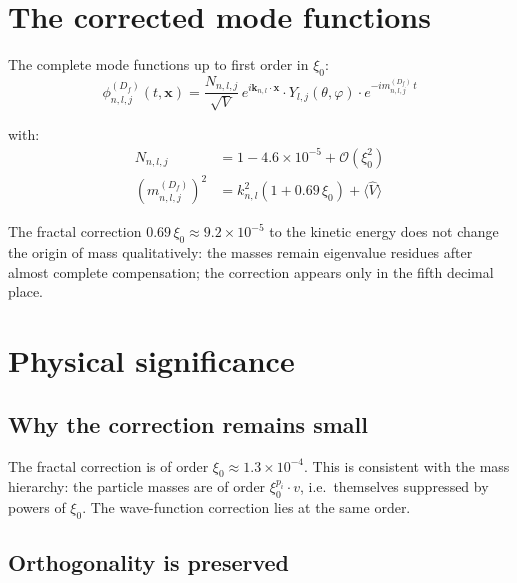 \section{The corrected mode functions}

The complete mode functions up to first order in $\xi_0$:
\begin{equation}
  \boxed{
    \phi_{n,l,j}^{(D_f)}(t,\mathbf{x})
    = \frac{N_{n,l,j}}{\sqrt{V}}\,
      e^{i\mathbf{k}_{n,l}\cdot\mathbf{x}} \cdot
      Y_{l,j}(\theta,\varphi) \cdot
      e^{-im_{n,l,j}^{(D_f)}\,t}
  }
  \label{eq:phi-korrigiert}
\end{equation}

with:
\begin{align}
  N_{n,l,j} &= 1 - 4.6\times10^{-5} + \mathcal{O}(\xi_0^2)
  \label{eq:N-final} \\
  \left(m_{n,l,j}^{(D_f)}\right)^2
  &= k_{n,l}^2\left(1 + 0.69\,\xi_0\right) + \langle\hat{V}\rangle
  \label{eq:m-korrigiert}
\end{align}

The fractal correction $0.69\,\xi_0 \approx 9.2 \times 10^{-5}$
to the kinetic energy does not change the origin of mass qualitatively:
the masses remain eigenvalue residues after almost complete
compensation; the correction appears only in the fifth decimal place.

\section{Physical significance}

\subsection{Why the correction remains small}

The fractal correction is of order $\xi_0 \approx 1.3\times10^{-4}$.
This is consistent with the mass hierarchy: the particle masses are
of order $\xi_0^{p_i} \cdot v$, i.e.\ themselves suppressed by powers
of $\xi_0$. The wave-function correction lies at the same order.

\subsection{Orthogonality is preserved}

